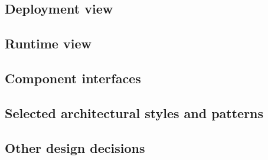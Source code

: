 \subsection{Deployment view}

\subsection{Runtime view}

\subsection{Component interfaces}

\subsection{Selected architectural styles and patterns}

\subsection{Other design decisions}
